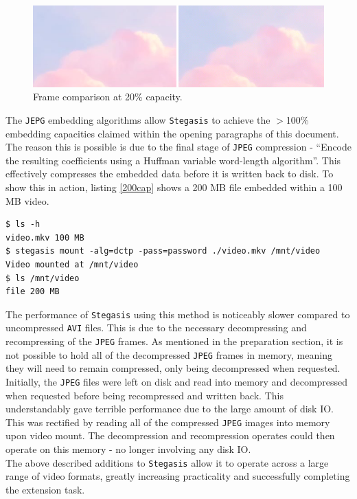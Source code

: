 \documentclass[paper=a4, fontsize=11pt,twoside]{scrartcl}
\numberwithin{table}{section}
\numberwithin{figure}{section}
\numberwithin{algorithm}{section}
\begin{document}
\begin{figure}[!h]
\centerline{\includegraphics[width=\textwidth]{images/bb_20cap.png}}
\caption{Frame comparison at 20\% capacity.}
\label{jpegnoart}
\end{figure}

\noindent
The \texttt{JEPG} embedding algorithms allow \texttt{Stegasis} to achieve the $>$100\% embedding capacities claimed within the opening paragraphs of this document. The reason this is possible is due to the final stage of \texttt{JPEG} compression - ``Encode the resulting coefficients using a Huffman variable word-length algorithm''. This effectively compresses the embedded data before it is written back to disk. To show this in action, listing \ref{200cap} shows a 200 MB file embedded within a 100 MB video.

\begin{lstlisting}[caption={Demonstration of 200\% embedding capacity.}, frame=single, label=200cap]
$ ls -h
video.mkv 100 MB
$ stegasis mount -alg=dctp -pass=password ./video.mkv /mnt/video
Video mounted at /mnt/video
$ ls /mnt/video
file 200 MB
\end{lstlisting}

The performance of \texttt{Stegasis} using this method is noticeably slower compared to uncompressed \texttt{AVI} files. This is due to the necessary decompressing and recompressing of the \texttt{JPEG} frames. As mentioned in the preparation section, it is not possible to hold all of the decompressed \texttt{JPEG} frames in memory, meaning they will need to remain compressed, only being decompressed when requested. Initially, the \texttt{JPEG} files were left on disk and read into memory and decompressed when requested before being recompressed and written back. This understandably gave terrible performance due to the large amount of disk IO. This was rectified by reading all of the compressed \texttt{JPEG} images into memory upon video mount. The decompression and recompression operates could then operate on this memory - no longer involving any disk IO.\\

\noindent
The above described additions to \texttt{Stegasis} allow it to operate across a large range of video formats, greatly increasing practicality and successfully completing the extension task.
\end{document}
